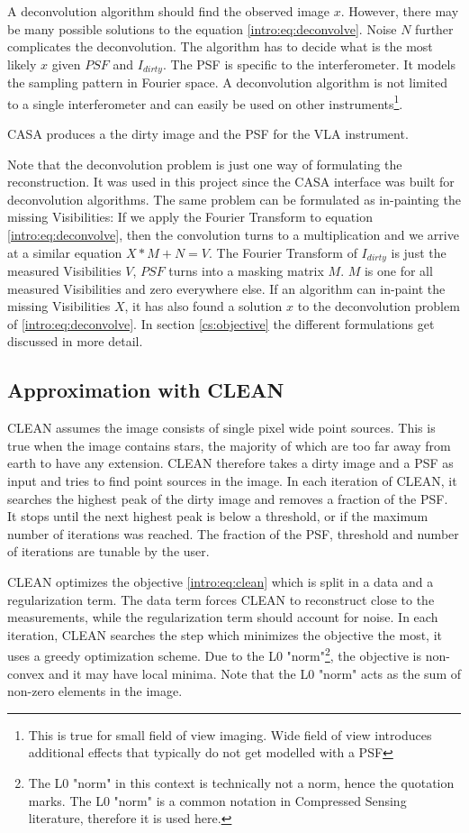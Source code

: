 A deconvolution algorithm should find the observed image $x$. However, there may be many possible solutions to the equation \eqref{intro:eq:deconvolve}. Noise $N$ further complicates the deconvolution. The algorithm has to decide what is the most likely $x$ given $PSF$ and $I_{dirty}$. The PSF is specific to the interferometer. It models the sampling pattern in Fourier space. A deconvolution algorithm is not limited to a single interferometer and can easily be used on other instruments\footnote{This is true for small field of view imaging. Wide field of view introduces additional effects that typically do not get modelled with a PSF}.

CASA produces a the dirty image and the PSF for the VLA instrument.

Note that the deconvolution problem is just one way of formulating the reconstruction. It was used in this project since the CASA interface was built for deconvolution algorithms. The same problem can be formulated as in-painting the missing Visibilities: If we apply the Fourier Transform to equation \eqref{intro:eq:deconvolve}, then the convolution turns to a multiplication and we arrive at a similar equation $X*M + N = V$. The Fourier Transform of $I_{dirty}$ is just the measured Visibilities $V$,  $PSF$ turns into a masking matrix $M$. $M$ is one for all measured Visibilities and zero everywhere else. If an algorithm can in-paint the missing Visibilities $X$, it has also found a solution $x$ to the deconvolution problem of \eqref{intro:eq:deconvolve}. In section \ref{cs:objective} the different formulations get discussed in more detail.


\subsection{Approximation with CLEAN}
CLEAN assumes the image consists of single pixel wide point sources. This is true when the image contains stars, the majority of which are too far away from earth to have any extension. CLEAN therefore takes a dirty image and a PSF as input and tries to find point sources in the image. In each iteration of CLEAN, it searches the highest peak of the dirty image and removes a fraction of the PSF. It stops until the next highest peak is below a threshold, or if the maximum number of iterations was reached. The fraction of the PSF, threshold and number of iterations are tunable by the user. 

CLEAN optimizes the objective \eqref{intro:eq:clean} which is split in a data and a regularization term. The data term forces CLEAN to reconstruct close to the measurements, while the regularization term should account for noise. In each iteration, CLEAN searches the step which minimizes the objective the most, it uses a greedy optimization scheme. Due to the L0 "norm"\footnote{The L0 "norm" in this context is technically not a norm, hence the quotation marks. The L0 "norm" is a common notation in Compressed Sensing literature, therefore it is used here.}, the objective is non-convex and it may have local minima. Note that the L0 "norm" acts as the sum of non-zero elements in the image.

